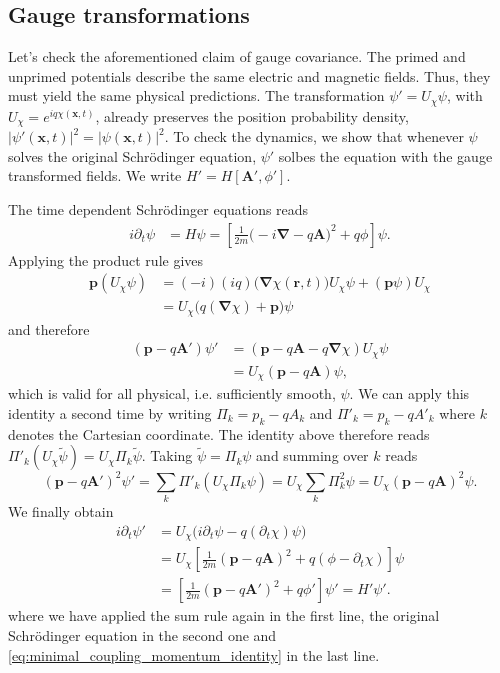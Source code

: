 \documentclass[../../main]{subfiles}
\begin{document}
\subsection{Gauge transformations}
\label{subsec:minimal_coupling_gauge_transformations}

Let's check the aforementioned claim of gauge covariance. The primed and unprimed potentials describe the same electric and magnetic fields. Thus, they must yield the same physical predictions. The transformation $\psi' = U_\chi \psi$, with \(U_\chi=e^{iq\chi(\bm{x},t)}\), already preserves the position probability density, $|\psi'(\bm x, t)|^2 = |\psi(\bm x, t)|^2$. To check the dynamics, we show that whenever $\psi$ solves the original Schrödinger equation, $\psi'$ solbes the equation with the gauge transformed fields. We write $H' = H \left[\bm A', \phi' \right]$.

The time dependent Schrödinger equations reads
\begin{align*}
  i\partial_t\psi &= H\psi
    = \left[\frac{1}{2m}\bigl(-i\bm{\nabla}-q\bm{A}\bigr)^2+q\phi\right]\psi .
\end{align*}
Applying the product rule gives
\begin{align*}
  \bm{p}(U_\chi\psi)
    &= (-i)(iq)\bigl(\bm{\nabla}\chi(\bm{r},t)\bigr)U_\chi\psi
       +(\bm{p}\psi)U_\chi \\
    &= U_\chi\bigl(q(\bm{\nabla}\chi)+\bm{p}\bigr)\psi
\end{align*}
and therefore
\begin{align*}
  (\bm{p}-q\bm{A}')\psi'
    &= (\bm{p}-q\bm{A}-q\bm{\nabla}\chi)U_\chi\psi \\
    &= U_\chi(\bm{p}-q\bm{A})\psi ,
\end{align*}
which is valid for all physical, i.e. sufficiently smooth, $\psi$. We can apply this identity a second time by writing $\Pi_k = p_k - qA_k$ and $\Pi'_k = p_k - qA'_k$ where $k$ denotes the Cartesian coordinate. The identity above therefore reads $\Pi'_k (U_\chi \tilde \psi) = U_\chi \Pi_k \tilde \psi$. Taking $\tilde \psi = \Pi_k \psi$ and summing over $k$ reads
\begin{equation}
    (\bm{p}-q\bm{A}')^2\psi'
       =\sum_k \Pi'_k(U_\chi\Pi_k\psi)
       =U_\chi\sum_k \Pi_k^2\psi
       =U_\chi(\bm{p}-q\bm{A})^2\psi. \label{eq:minimal_coupling_momentum_identity}
\end{equation}
We finally obtain
\begin{align*}
    i\partial_t\psi'
       &=U_\chi\bigl(i\partial_t\psi-q(\partial_t\chi)\psi\bigr) \\
       &=U_\chi\left[\frac{1}{2m}(\bm{p}-q\bm{A})^2
                       +q(\phi-\partial_t\chi)\right]\psi \\
       &=\left[\frac{1}{2m}(\bm{p}-q\bm{A}')^2+q\phi'\right]\psi'
        =H'\psi'.
\end{align*}
where we have applied the sum rule again in the first line, the original Schrödinger equation in the second one and \cref{eq:minimal_coupling_momentum_identity} in the last line.
\end{document}
